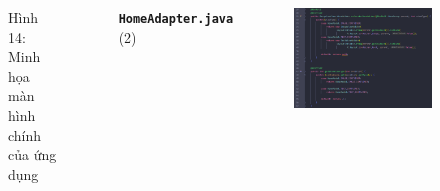 \documentclass{beamer}
\begin{document}
\begin{frame}
\begin{columns}
\begin{figure}
            \caption{\centering\tiny{Hình 14: Minh họa màn hình chính của ứng dụng}}
        \end{figure}
        \indent \textbf{\texttt{HomeAdapter.java}} (2)
        \begin{figure}
            \centering
            \includegraphics[width=\textwidth]{images/19.png}
        \end{figure}
    \end{columns}
\end{frame}
\end{document}
